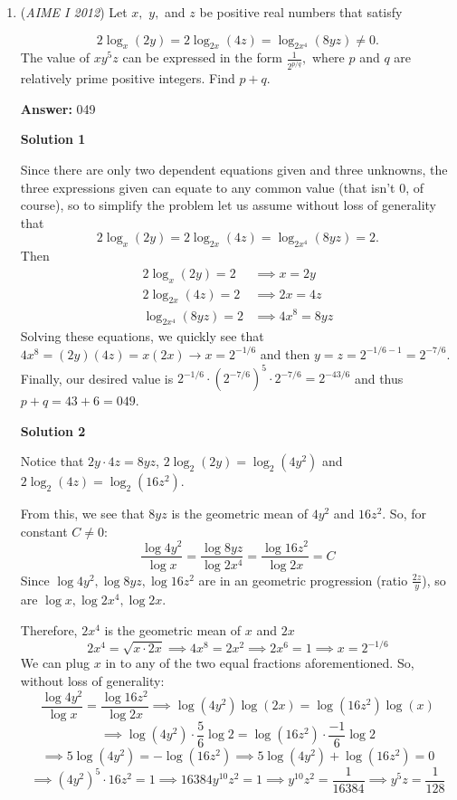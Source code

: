 \begin{enumerate}
 \href{https://artofproblemsolving.com/videos/amc/2012aimei/344}{https://artofproblemsolving.com/videos/amc/2012aimei/344}

 


	\item (\textit{AIME I 2012}) Let $x,$ $y,$ and $z$ be positive real numbers that satisfy

 \[2\log_{x}(2y) = 2\log_{2x}(4z) = \log_{2x^4}(8yz) \ne 0.\]
The value of $xy^5z$ can be expressed in the form $\frac{1}{2^{p/q}},$ where $p$ and $q$ are relatively prime positive integers. Find $p+q.$

 \textbf{Answer: }049



\textbf{Solution 1}

Since there are only two dependent equations given and three unknowns, the three expressions given can equate to any common value (that isn't 0, of course), so to simplify the problem let us assume without loss of generality that
 \[2\log_{x}(2y) = 2\log_{2x}(4z) = \log_{2x^4}(8yz) = 2.\]Then
 \begin{align*} 2\log_{x}(2y) = 2 &\implies x=2y\\ 2\log_{2x}(4z) = 2 &\implies 2x=4z\\ \log_{2x^4}(8yz) = 2 &\implies 4x^8 = 8yz \end{align*}
Solving these equations, we quickly see that $4x^8 = (2y)(4z) = x(2x) \rightarrow x=2^{-1/6}$ and then $y=z=2^{-1/6 - 1} = 2^{-7/6}.$Finally, our desired value is $2^{-1/6} \cdot (2^{-7/6})^5 \cdot 2^{-7/6} = 2^{-43/6}$ and thus $p+q = 43 + 6 = \boxed{049.}$




\textbf{Solution 2}

Notice that $2y\cdot 4z=8yz$, $2\log_2(2y)=\log_2\left(4y^2\right)$ and $2\log_2(4z)=\log_2\left(16z^2\right)$.

 From this, we see that $8yz$ is the geometric mean of $4y^2$ and $16z^2$. So, for constant $C\ne 0$:
 \[\frac{\log 4y^2}{\log x}=\frac{\log 8yz}{\log 2x^4}=\frac{\log 16z^2}{\log 2x}=C\]Since $\log 4y^2,\log 8yz,\log 16z^2$ are in an geometric progression (ratio $\frac{2z}{y}$), so are $\log x,\log 2x^4,\log 2x$.

 Therefore, $2x^4$ is the geometric mean of $x$ and $2x$
 \[2x^4=\sqrt{x\cdot 2x}\implies 4x^8=2x^2\implies 2x^6=1\implies x=2^{-1/6}\]We can plug $x$ in to any of the two equal fractions aforementioned. So, without loss of generality:
 \[\frac{\log 4y^2}{\log x}=\frac{\log 16z^2}{\log 2x}\implies \log\left(4y^2\right)\log\left(2x\right)=\log\left(16z^2\right)\log\left(x\right)\]
 \[\implies \log\left(4y^2\right)\cdot \frac{5}{6}\log 2=\log\left(16z^2\right)\cdot \frac{-1}{6}\log 2\]
 \[\implies 5\log\left(4y^2\right)=-\log\left(16z^2\right)\implies 5\log\left(4y^2\right)+\log\left(16z^2\right)=0\]
 \[\implies \left(4y^2\right)^5\cdot 16z^2=1\implies 16384y^{10}z^2=1\implies y^{10}z^2=\frac{1}{16384}\implies y^5z=\frac{1}{128}\]


\end{enumerate}
